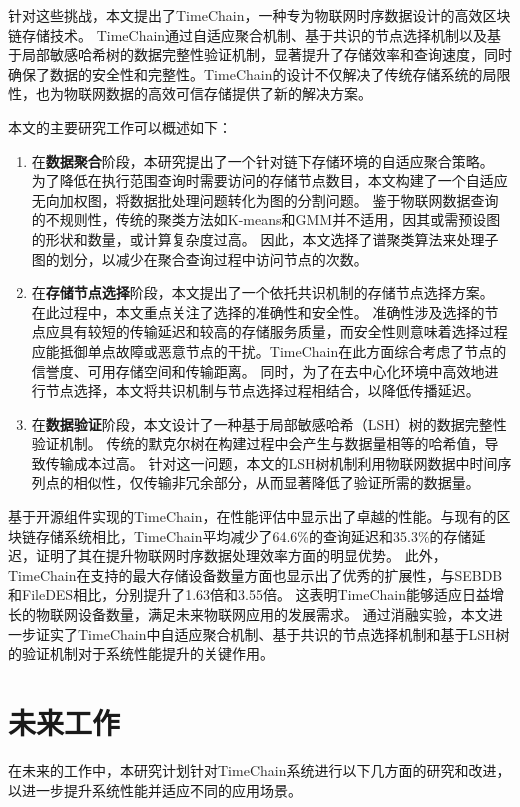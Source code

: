 针对这些挑战，本文提出了TimeChain，一种专为物联网时序数据设计的高效区块链存储技术。
TimeChain通过自适应聚合机制、基于共识的节点选择机制以及基于局部敏感哈希树的数据完整性验证机制，显著提升了存储效率和查询速度，同时确保了数据的安全性和完整性。TimeChain的设计不仅解决了传统存储系统的局限性，也为物联网数据的高效可信存储提供了新的解决方案。

本文的主要研究工作可以概述如下：

\begin{enumerate}
    \item 在\textbf{数据聚合}阶段，本研究提出了一个针对链下存储环境的自适应聚合策略。
    为了降低在执行范围查询时需要访问的存储节点数目，本文构建了一个自适应无向加权图，将数据批处理问题转化为图的分割问题。
    鉴于物联网数据查询的不规则性，传统的聚类方法如K-means和GMM并不适用，因其或需预设图的形状和数量，或计算复杂度过高。
    因此，本文选择了谱聚类算法来处理子图的划分，以减少在聚合查询过程中访问节点的次数。
    \item 在\textbf{存储节点选择}阶段，本文提出了一个依托共识机制的存储节点选择方案。
    在此过程中，本文重点关注了选择的准确性和安全性。
    准确性涉及选择的节点应具有较短的传输延迟和较高的存储服务质量，而安全性则意味着选择过程应能抵御单点故障或恶意节点的干扰。TimeChain在此方面综合考虑了节点的信誉度、可用存储空间和传输距离。
    同时，为了在去中心化环境中高效地进行节点选择，本文将共识机制与节点选择过程相结合，以降低传播延迟。
    \item 在\textbf{数据验证}阶段，本文设计了一种基于局部敏感哈希（LSH）树的数据完整性验证机制。
    传统的默克尔树在构建过程中会产生与数据量相等的哈希值，导致传输成本过高。
    针对这一问题，本文的LSH树机制利用物联网数据中时间序列点的相似性，仅传输非冗余部分，从而显著降低了验证所需的数据量。
\end{enumerate}

基于开源组件实现的TimeChain，在性能评估中显示出了卓越的性能。与现有的区块链存储系统相比，TimeChain平均减少了64.6\%的查询延迟和35.3\%的存储延迟，证明了其在提升物联网时序数据处理效率方面的明显优势。
此外，TimeChain在支持的最大存储设备数量方面也显示出了优秀的扩展性，与SEBDB和FileDES相比，分别提升了1.63倍和3.55倍。
这表明TimeChain能够适应日益增长的物联网设备数量，满足未来物联网应用的发展需求。
通过消融实验，本文进一步证实了TimeChain中自适应聚合机制、基于共识的节点选择机制和基于LSH树的验证机制对于系统性能提升的关键作用。

\section{未来工作}
在未来的工作中，本研究计划针对TimeChain系统进行以下几方面的研究和改进，以进一步提升系统性能并适应不同的应用场景。


